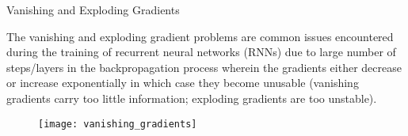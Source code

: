 \documentclass[10pt]{beamer}
\begin{document}
\begin{frame}[fragile]{Vanishing and Exploding Gradients}

	The vanishing and exploding gradient problems are common issues encountered during the training of recurrent
	neural networks (RNNs) due to large number of steps/layers in the backpropagation process wherein the gradients
	either decrease or increase exponentially in which case they become unusable (vanishing gradients carry too
	little information; exploding gradients are too unstable).

	\begin{figure}[h]
		\centering
		\texttt{[image: vanishing\_gradients]}
	\end{figure}



\end{frame}
\end{document}
